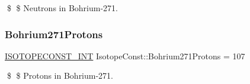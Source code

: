 \$ \$ Neutrons in Bohrium-\/271. \mbox{\label{group___isotope_const-_bohrium-_bh271_ga4f66bdd09ac167822e97742cc912a44e}} 
\subsubsection{\texorpdfstring{Bohrium271\+Protons}{Bohrium271Protons}}
{\footnotesize\ttfamily \mbox{\hyperlink{group___isotope_const-_macros_ga5f18360b3e99483a35c32d789e62621c}{I\+S\+O\+T\+O\+P\+E\+C\+O\+N\+S\+T\+\_\+\+I\+NT}} Isotope\+Const\+::\+Bohrium271\+Protons = 107}

\$ \$ Protons in Bohrium-\/271. 